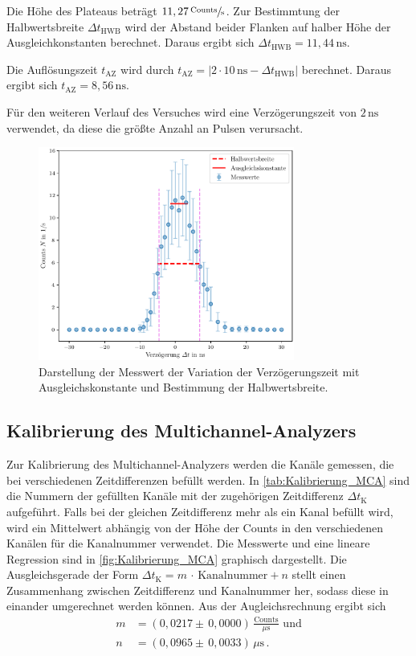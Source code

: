 Die Höhe des Plateaus beträgt $11,27 \, \sfrac{\text{Counts}}{\unit{\second}}$.
Zur Bestimmtung der Halbwertsbreite $\Delta t_{\text{HWB}}$ wird der Abstand 
beider Flanken auf halber Höhe der Ausgleichkonstanten berechnet.
Daraus ergibt sich $\Delta t_{\text{HWB}} = 11,44 \, \unit{\nano\second}$. 

Die Auflösungszeit $t_{\text{AZ}}$ wird durch  
$t_{\text{AZ}} = |2 \cdot 10 \, \unit{\nano\second}-\Delta t_{\text{HWB}}|$ berechnet.
Daraus ergibt sich $t_{\text{AZ}} = 8,56 \, \unit{\nano\second}$.

Für den weiteren Verlauf des Versuches wird eine Verzögerungszeit von $2 \,\unit{\nano\second}$ verwendet, da diese die 
größte Anzahl an Pulsen verursacht.
\begin{figure}
  \centering
  \includegraphics[width=0.75\textwidth]{Verzoegerung.pdf}
  \caption{Darstellung der Messwert der Variation der Verzögerungszeit mit Ausgleichskonstante und Bestimmung der Halbwertsbreite.}
  \label{fig:Verzoegerung}
\end{figure}
\FloatBarrier

\subsection{Kalibrierung des Multichannel-Analyzers}

Zur Kalibrierung des Multichannel-Analyzers werden die Kanäle 
gemessen, die bei verschiedenen Zeitdifferenzen befüllt werden. 
In \autoref{tab:Kalibrierung_MCA} sind die Nummern der
 gefüllten Kanäle mit der zugehörigen Zeitdifferenz 
 $\Delta t_{\text{K}}$ aufgeführt. Falls bei der gleichen Zeitdifferenz 
 mehr als ein Kanal befüllt wird, wird ein Mittelwert abhängig 
 von der Höhe der Counts in den verschiedenen Kanälen für 
 die Kanalnummer verwendet. Die Messwerte und eine lineare Regression 
 sind in \autoref{fig:Kalibrierung_MCA} graphisch dargestellt. 
 Die Ausgleichsgerade der Form $\Delta t_{\text{K}} = m \, \cdot \,\text{Kanalnummer} + n$
 stellt einen Zusammenhang zwischen Zeitdifferenz und Kanalnummer her, 
 sodass diese in einander umgerechnet werden können. 
 Aus der Augleichsrechnung ergibt sich 
 \begin{align*}
 m &= (0,0217 \pm \, 0,0000) \, \frac{\text{Counts}}{\unit{\mu\second}}\, \, \text{und} \\
 n &= (0,0965 \pm \, 0,0033) \, \unit{\mu\second} \,. 
 \end{align*}

